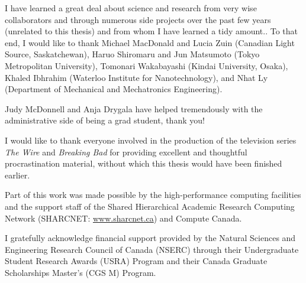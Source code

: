 I have learned a great deal about science and research from very wise collaborators and through numerous side projects over the past few years (unrelated to this thesis) and from whom I have learned a tidy amount.. To that end, I would like to thank Michael MacDonald and Lucia Zuin (Canadian Light Source, Saskatchewan), Haruo Shiromaru and Jun Matsumoto (Tokyo Metropolitan University), Tomonari Wakabayashi (Kindai University, Osaka), Khaled Ibhrahim (Waterloo Institute for Nanotechnology), and Nhat Ly (Department of Mechanical and Mechatronics Engineering).

Judy McDonnell and Anja Drygala have helped tremendously with the administrative side of being a grad student, thank you!


I would like to thank everyone involved in the production of the television series \emph{The Wire} and \emph{Breaking Bad} for providing excellent and thoughtful procrastination material, without which this thesis would have been finished earlier.

Part of this work was made possible by the high-performance computing facilities and the support staff of the Shared Hierarchical Academic Research Computing Network (SHARCNET: \href{www.sharcnet.ca}{www.sharcnet.ca}) and Compute Canada.

I gratefully acknowledge financial support provided by the Natural Sciences and Engineering Research Council of Canada (NSERC) through their Undergraduate Student Research Awards (USRA) Program and their Canada Graduate Scholarships Master's (CGS M) Program.

\endgroup